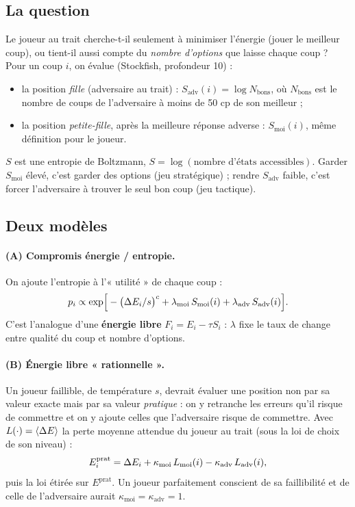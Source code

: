 \subsection{La question}
Le joueur au trait cherche-t-il seulement à minimiser l'énergie (jouer le meilleur coup), ou tient-il aussi compte
du \emph{nombre d'options} que laisse chaque coup ? Pour un coup $i$, on évalue (Stockfish, profondeur 10) :
\begin{itemize}
  \item la position \emph{fille} (adversaire au trait) : $S_\text{adv}(i) = \log N_\text{bons}$, où $N_\text{bons}$
        est le nombre de coups de l'adversaire à moins de 50 cp de son meilleur ;
  \item la position \emph{petite-fille}, après la meilleure réponse adverse : $S_\text{moi}(i)$, même définition
        pour le joueur.
\end{itemize}
$S$ est une entropie de Boltzmann, $S = \log(\text{nombre d'états accessibles})$. Garder $S_\text{moi}$ élevé,
c'est garder des options (jeu \og stratégique\fg{}) ; rendre $S_\text{adv}$ faible, c'est forcer l'adversaire à
trouver le seul bon coup (jeu \og tactique\fg{}).

\subsection{Deux modèles}
\paragraph{(A) Compromis énergie / entropie.} On ajoute l'entropie à l'« utilité » de chaque coup :
\begin{equation}
  p_i \propto \exp\!\Big[-\big(\Delta E_i/s\big)^{c} + \lambda_\text{moi}\, S_\text{moi}(i) + \lambda_\text{adv}\, S_\text{adv}(i)\Big].
\end{equation}
C'est l'analogue d'une \textbf{énergie libre} $F_i = E_i - \tau S_i$ : $\lambda$ fixe le taux de change entre
qualité du coup et nombre d'options.

\paragraph{(B) Énergie libre « rationnelle ».} Un joueur faillible, de température $s$, devrait évaluer une position
non par sa valeur exacte mais par sa valeur \emph{pratique} : on y retranche les erreurs qu'il risque de commettre
et on y ajoute celles que l'adversaire risque de commettre. Avec $L(\cdot) = \langle \Delta E\rangle$ la perte moyenne
attendue du joueur au trait (sous la loi de choix de son niveau) :
\begin{equation}
  E_i^{\text{prat}} = \Delta E_i + \kappa_\text{moi}\, L_\text{moi}(i) - \kappa_\text{adv}\, L_\text{adv}(i),
\end{equation}
puis la loi étirée sur $E^{\text{prat}}$. Un joueur parfaitement conscient de sa faillibilité et de celle de
l'adversaire aurait $\kappa_\text{moi} = \kappa_\text{adv} = 1$.

